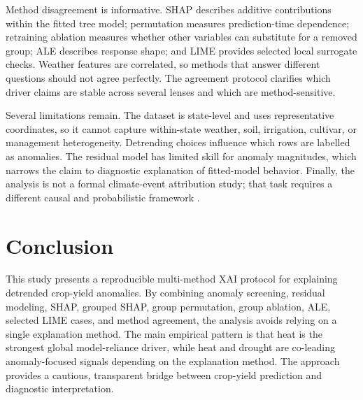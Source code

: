 \documentclass[11pt]{article}
\begin{document}
Method disagreement is informative. SHAP describes additive contributions within the
fitted tree model; permutation measures prediction-time dependence; retraining
ablation measures whether other variables can substitute for a removed group; ALE
describes response shape; and LIME provides selected local surrogate checks. Weather
features are correlated, so methods that answer different questions should not agree
perfectly. The agreement protocol clarifies which driver claims are stable across
several lenses and which are method-sensitive.

Several limitations remain. The dataset is state-level and uses representative
coordinates, so it cannot capture within-state weather, soil, irrigation, cultivar,
or management heterogeneity. Detrending choices influence which rows are labelled as
anomalies. The residual model has limited skill for anomaly magnitudes, which narrows
the claim to diagnostic explanation of fitted-model behavior. Finally, the analysis
is not a formal climate-event attribution study; that task requires a different
causal and probabilistic framework \citep{Otto2017,Oldenborgh2021,Otto2023}.

\section{Conclusion}
This study presents a reproducible multi-method XAI protocol for explaining
detrended crop-yield anomalies. By combining anomaly screening, residual modeling,
SHAP, grouped SHAP, group permutation, group ablation, ALE, selected LIME cases, and
method agreement, the analysis avoids relying on a single explanation method. The
main empirical pattern is that heat is the strongest global model-reliance driver,
while heat and drought are co-leading anomaly-focused signals depending on the
explanation method. The approach provides a cautious, transparent bridge between
crop-yield prediction and diagnostic
interpretation.



\end{document}
